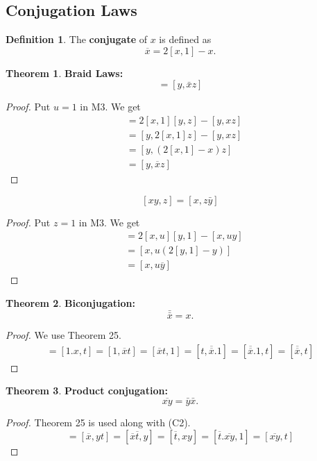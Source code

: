 \documentclass[11pt]{report}
\theoremstyle{plain}
\theoremstyle{definition}
\newtheorem{defn}{Definition}
\newtheorem{theorem}{Theorem}
\begin{document}
 \subsection{Conjugation Laws}
 \begin{defn}
 The \textbf{conjugate} of $ x $ is defined as $$ \overline{x} = 2[x,1] - x. $$
 \end{defn}
 \begin{theorem}
 	\textbf{ Braid Laws: }
 	\begin{equation}
 	[xy,z] = [y,\bar{x}z] \tag{C1}\label{C1}
 	\end{equation}
 \end{theorem}
 \begin{proof}
  Put $ u = 1 $ in M3. We get 
  \begin{align*}
  [xy,z] &= 2[x,1][y,z] - [y,xz] \\
   &=[y,2[x,1]z]-[y,xz]\\
   &=[y,(2[x,1]-x)z]\\
   &=[y,\overline{x}z]
  \end{align*}
 \end{proof}
 $$ [xy,z] = [x,z\bar{y}]	 $$
 \begin{proof}
 Put $ z =1 $ in M3. We get
\begin{align*}
[xy,u] &= 2[x,u][y,1] - [x,uy]\\
&=[x,u(2[y,1]-y)]\\
&=[x,u\overline{y}]
\end{align*}
 \end{proof}
 \begin{theorem}
 	\textbf{ Biconjugation: }
 	\begin{equation*}
 	\bar{\bar{x}} = x . \tag{C2}\label{C2}
 	 \end{equation*}
 \end{theorem}
 \begin{proof}
 	We use Theorem 25.
 	\begin{align*}
[x,t] = [1.x,t] = [1,\overline{x}t] = [\overline{x}t,1] = [t,\overline{\overline{x}}.1] = [\overline{\overline{x}}.1,t] = [\overline{\overline{x}},t]
	\end{align*}
 \end{proof}
 \begin{theorem}
 	\textbf{ Product conjugation: }
 		\begin{equation*}
 		\overline{xy} = \bar{y}\bar{x} . \tag{C3}\label{C3}
 		\end{equation*}
 \end{theorem}
 \begin{proof}
 	Theorem 25 is used along with (C2).
 	\begin{equation*}
	[\bar{y}\bar{x},t] = [\overline{x} , yt] = [\overline{x}\overline{t},y]  = [\overline{t}, xy] = [\overline{t}.\overline{xy},1] = [\overline{xy},t]	
	\end{equation*}
 \end{proof}
 
\end{document}
